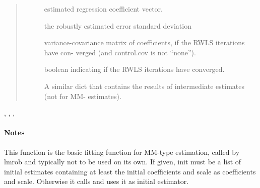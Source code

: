\documentclass[letterpaper,10pt,english]{sphinxmanual}
\begin{document}
\begin{fulllineitems}
\begin{quote}
\begin{description}
\begin{description}
\item[{}] \leavevmode
estimated regression coefficient vector.

\item[{}] \leavevmode
the robustly estimated error standard deviation

\item[{}] \leavevmode
variance-covariance matrix of coefficients, if the RWLS iterations have con-
verged (and control.cov is not “none”).

\item[{}] \leavevmode
\item[{}] \leavevmode
\item[{}] \leavevmode
boolean indicating if the RWLS iterations have converged.

\item[{}] \leavevmode
A similar dict that contains the results of intermediate estimates (not for MM-
estimates).

\end{description}

\end{description}\end{quote}




{\hyperref[\detokenize{_modules/lmrob:module-lmrob}]{}}, {\hyperref[\detokenize{_modules/lmrob:lmrob.lmrob__M__fit}]{}}, {\hyperref[\detokenize{_modules/lmrob:lmrob.lmrob__D__fit}]{}}, {\hyperref[\detokenize{_modules/lmrob:lmrob.lmrob_S}]{}}


\paragraph{Notes}

This function is the basic fitting function for MM-type estimation, called by lmrob and typically
not to be used on its own.
If given, init must be a list of initial estimates containing at least the initial coefficients and scale
as coefficients and scale. Otherwise it calls  and uses it as initial estimator.

\end{fulllineitems}
\end{document}
